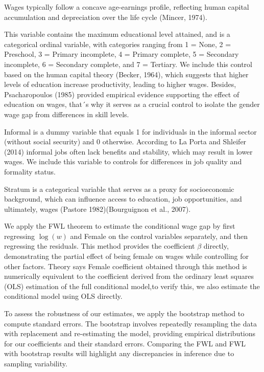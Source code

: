 \documentclass[a4paper,12pt]{article}
\begin{document}
\begin{description}[leftmargin=0cm]
\item [Age and Age Squared:] Wages typically follow a concave age-earnings profile, reflecting human capital accumulation and depreciation over the life cycle (Mincer, 1974).

\item[Education:]  This variable contains the maximum educational level attained, and is a categorical ordinal variable, with categories ranging from 1 = None, 2 = Preschool, 3 = Primary incomplete, 4 = Primary complete, 5 = Secondary incomplete, 6 = Secondary complete, and 7 = Tertiary. We include this control based on the human capital theory (Becker, 1964), which suggests that higher levels of education increase productivity, leading to higher wages. Besides, Psacharopoulos (1985) provided empirical evidence supporting the effect of education on wages, that´s why it serves as a crucial control to isolate the gender wage gap from differences in skill levels.

\item[Informality:]  Informal is a dummy variable that equals 1 for individuals in the informal sector (without social security) and 0 otherwise.
According to La Porta and Shleifer (2014) informal jobs often lack benefits and stability, which may result in lower wages. We include this variable to controls for differences in job quality and formality status.

\item [Socioeconomic Status (Stratum):] Stratum is a categorical variable that serves as a proxy for socioeconomic background, which can influence access to education, job opportunities, and ultimately, wages (Pastore 1982)(Bourguignon et al., 2007).
\end{description}

We apply the FWL theorem to estimate the conditional wage gap by first regressing $\log(w)$ and Female on the control variables separately, and then regressing the residuals. This method provides the coefficient $\beta$ directly, demonstrating the partial effect of being female on wages while controlling for other factors. Theory says Female coefficient obtained through this method is numerically equivalent to the coefficient derived from the ordinary least squares (OLS) estimation of the full conditional model,to verify this, we also estimate the conditional model using OLS directly.

To assess the robustness of our estimates, we apply the bootstrap method to compute standard errors. The bootstrap involves repeatedly resampling the data with replacement and re-estimating the model, providing empirical distributions for our coefficients and their standard errors. Comparing the FWL and FWL with bootstrap results will highlight any discrepancies in inference due to sampling variability.
\end{document}
